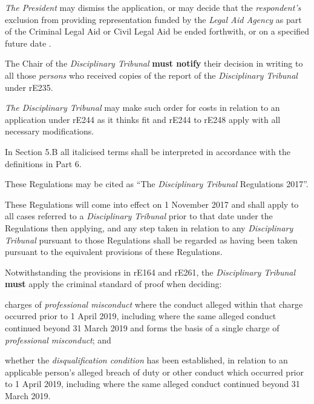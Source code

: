 \emph{The President} may dismiss the application, or may decide that
the \emph{respondent's} exclusion from providing representation funded
by the \emph{Legal Aid Agency} as part of the Criminal Legal Aid or
Civil Legal Aid be ended forthwith, or on a specified future date .\\
\par
The Chair of the\emph{ Disciplinary Tribunal}  \textcolor{myred}{\textbf{must notify}} their decision
in writing to all those \emph{persons} who received copies of the report
of the \emph{Disciplinary Tribunal} under rE235.\\
\par
\emph{The Disciplinary Tribunal }may make such order for costs in
relation to an application under rE244 as it thinks fit and rE244 to
rE248 apply with all necessary modifications.\\
\par
{}
In Section 5.B all italicised terms shall be interpreted in accordance
with the definitions in Part 6. \\
\par
{}
These Regulations may be cited as ``The \emph{Disciplinary
Tribunal} Regulations 2017''.\\
\par
These Regulations will come into effect on 1 November 2017 and shall
apply to all cases referred to a \emph{Disciplinary Tribunal }prior to
that date under the Regulations then applying, and any step taken in
relation to any \emph{Disciplinary Tribunal }pursuant to those
Regulations shall be regarded as having been taken pursuant to the
equivalent provisions of these Regulations.\\
\par
Notwithstanding the provisions in rE164 and rE261,
the \emph{Disciplinary Tribunal}  \textcolor{myred}{\textbf{must}} apply the criminal standard of
proof when deciding:\\\nl \item charges of \emph{professional misconduct} where the conduct alleged
within that charge occurred prior to 1 April 2019, including where the
same alleged conduct continued beyond 31 March 2019 and forms the basis
of a single charge of \emph{professional misconduct}; and\item whether the \emph{disqualification condition} has been established,
in relation to an applicable person's alleged breach of duty or other
conduct which occurred prior to 1 April 2019, including where the same
alleged conduct continued beyond 31 March 2019.\ln
{}

